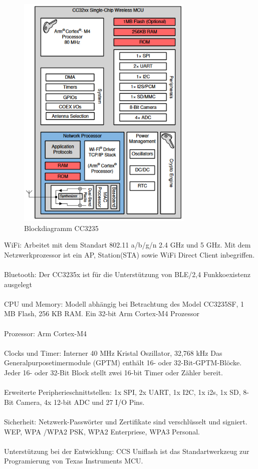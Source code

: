 \begin{figure}[H]
	\centering
	\includegraphics[width=0.75\textwidth]{graphics/blockdiagrammCC3235.PNG}
	\caption{Blockdiagramm CC3235 \cite{noauthor_cc3235s.pdf_nodate}}
	
	\label{pic: blockdiagrammCC3235}
\end{figure} 

WiFi: Arbeitet mit dem Standart 802.11 a/b/g/n 2.4 GHz und 5 GHz. Mit dem Netzwerkprozessor ist ein AP, Station(STA) sowie WiFi Direct Client inbegriffen.\\
\\
Bluetooth:
Der CC3235x ist für die Unterstützung von BLE/2,4 Funkkoexistenz ausgelegt\\
\\
CPU und Memory: Modell abhängig bei Betrachtung des Model CC3235SF, 1 MB Flash, 256 KB RAM. Ein 32-bit Arm Cortex-M4 Prozessor \\
\\
Prozessor: Arm Cortex-M4\\
\\
Clocks und Timer:
Interner 40 MHz Kristal Oszillator, 32,768 kHz  
Das Generalpurposetimermodule (GPTM) enthält 16- oder 32-Bit-GPTM-Blöcke. Jeder 16-  oder 32-Bit Block stellt zwei 16-bit Timer oder Zähler bereit.\\
\\
Erweiterte Peripherieschnittstellen:
1x SPI, 2x UART, 1x I2C, 1x i2s, 1x SD, 8-Bit Camera, 4x 12-bit ADC und 27 I/O Pins.\\
\\
Sicherheit:
Netzwerk-Passwörter und Zertifikate sind verschlüsselt und signiert. WEP, WPA /WPA2 PSK, WPA2 Enterpriese, WPA3 Personal.\\
\\
Unterstützung bei der Entwicklung:
CCS Uniflash ist das Standartwerkzeug zur Programierung von Texas Instruments MCU.

